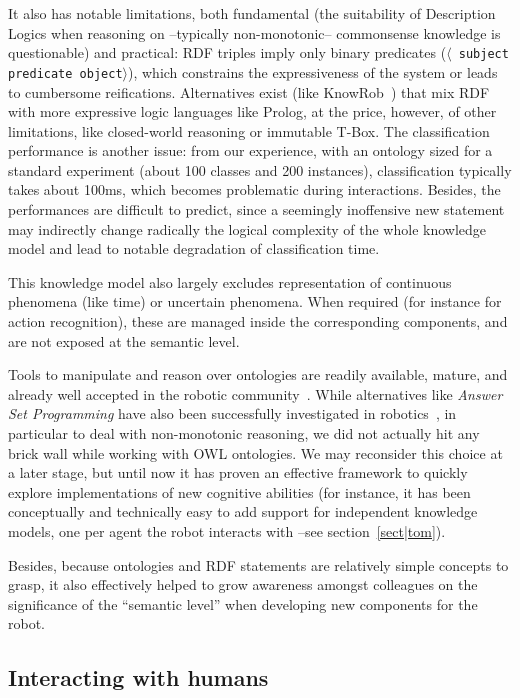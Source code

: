 \documentclass[preprint,5p]{elsarticle}
\newcommand{\stmt}[1]{{\footnotesize \tt $\langle$ #1\relax$\rangle$}}
\begin{document}
It also has notable limitations, both fundamental (the suitability
of Description Logics when reasoning on --typically non-monotonic-- commonsense
knowledge is questionable) and practical: RDF triples imply only binary predicates
(\stmt{subject predicate object}), which constrains the expressiveness of the
system or leads to cumbersome reifications. Alternatives exist (like {\sc
KnowRob}~\cite{Tenorth2009a}) that mix RDF with more expressive logic
languages like {\sc Prolog}, at the price, however, of other limitations, like
closed-world reasoning or immutable T-Box. The classification
performance is another issue: from our experience, with an ontology sized for a
standard experiment (about 100 classes and 200 instances), classification
typically takes about 100ms, which becomes problematic during interactions.
Besides, the performances are difficult to predict, since a seemingly
inoffensive new statement may indirectly change radically the logical
complexity of the whole knowledge model and lead to notable degradation of
classification time.

This knowledge model also largely excludes representation of continuous
phenomena (like time) or uncertain phenomena. When required (for instance for
action recognition), these are managed inside the corresponding components, and
are not exposed at the semantic level.

Tools to manipulate and reason over ontologies are readily available, mature,
and already well accepted in the robotic community~\cite{Tenorth2009a,
Lim2011}. While alternatives like \emph{Answer Set Programming} have also been
successfully investigated in robotics~\cite{Chen2010,Erdem2012}, in particular
to deal with non-monotonic reasoning, we did not actually hit any brick wall
while working with OWL ontologies. We may reconsider this choice at a later
stage, but until now it has proven an effective framework to quickly explore
implementations of new cognitive abilities (for instance, it has been
conceptually and technically easy to add support for independent knowledge
models, one per agent the robot interacts with --see section~\ref{sect|tom}).

Besides, because ontologies and RDF statements are relatively simple concepts
to grasp, it also effectively helped to grow awareness amongst colleagues on
the significance of the ``semantic level'' when developing new components for
the robot.


\subsection{Interacting with humans}
\end{document}
